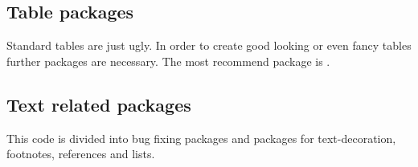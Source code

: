 

\subsection{Table packages}
\label{sec:packages:tables}

Standard \latex tables are just ugly. In order to create good looking or even fancy tables further packages are necessary. The most recommend package is .

 

\subsection{Text related packages}
\label{sec:packages:text}

This code is divided into bug fixing packages and packages for text-decoration, footnotes, references and lists.


